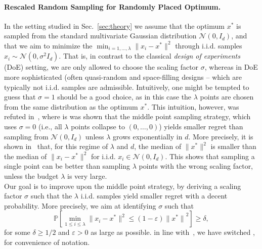 \paragraph{Rescaled Random Sampling for Randomly Placed Optimum.} In the setting studied in Sec.~\ref{sec:theory} we assume that the optimum $x^*$ is sampled from the standard multivariate Gaussian distribution $\mathcal{N}(0,I_d)$, and that we aim to minimize the  $\min_{i=1,\ldots,\lambda} \lVert x_i-x^*\rVert^2$ through i.i.d. samples $x_i \sim \mathcal{N}(0,\sigma^2 I_d)$. That is, in contrast to the classical \textit{design of experiments} (DoE) setting, we are only allowed to choose the scaling factor $\sigma$, whereas in DoE more sophisticated (often quasi-random and space-filling designs -- which are typically not i.i.d. samples\olivier{)} are admissible.
Intuitively, one might be tempted to guess that $\sigma=1$ should be a good choice, as in this case the $\lambda$ points are chosen from the same distribution as the optimum $x^*$. This intuition, however, was refuted in~\cite[Theorem~1]{icmldoe}, where is was shown that the middle point sampling strategy, which uses $\sigma=0$ (i.e., all $\lambda$ points collapse to $(0,\ldots,0)$) yields smaller regret than sampling from $\mathcal{N}(0,I_d)$ unless $\lambda$ grows exponentially in $d$. More precisely, it is shown in~\cite{icmldoe} that, for this regime of $\lambda$ and $d$, the median of $\lVert x^*\rVert^2$ is smaller than the median of $\lVert x_i - x^*\rVert^2$ for i.i.d. $x_i \in \mathcal{N}(0,I_d)$.  
This shows that sampling a single point can be better than sampling $\lambda$ points with the wrong scaling factor, unless the budget $\lambda$ is very large. \\
Our goal is to improve upon the middle point strategy, by deriving a scaling factor $\sigma$ such that the $\lambda$ i.i.d. samples yield smaller regret with a decent probability. More precisely, we aim at identifying $\sigma$ such that
\begin{equation}
\mathbb{P}\left[\min_{1\leq i \leq \lambda} \lVert x_i-x^*\rVert^2\leq (1-\varepsilon){\lVert x^*\rVert}^2\right]\geq \delta,
\label{beginning}
\end{equation}
for some $\delta \ge 1/2$ and $\varepsilon >0$ as large as possible. in line with~\cite{icmldoe}, we have switched , for convenience of notation. 
